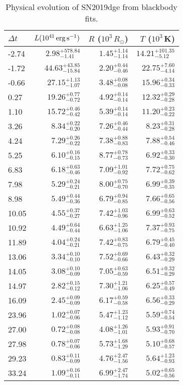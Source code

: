 \begin{table}[!htbp] 
	\centering 
	\caption{Physical evolution of SN2019dge from blackbody fits.} 
	\begin{tabular}{lrrr} 
		\hline 
		$\Delta t$ & $L (10^{41} \,{\rm erg\,s^{-1}})$ & $R$ ($10^{3}\,R_\odot$) & $T$ ($10^3$\,K) \\ 
		\hline
		-2.74 & $2.98^{+578.84}_{-1.41}$ &$1.45^{+1.14}_{-1.14}$ &$14.21^{+101.35}_{-5.12}$  \\
		-1.72 & $44.63^{+43.85}_{-15.84}$ &$2.20^{+0.44}_{-0.46}$ &$22.75^{+7.60}_{-4.14}$  \\
		-0.66 & $27.15^{+1.13}_{-1.07}$ &$3.48^{+0.08}_{-0.08}$ &$15.96^{+0.34}_{-0.33}$  \\
		0.27 & $19.26^{+0.77}_{-0.72}$ &$4.92^{+0.14}_{-0.14}$ &$12.32^{+0.29}_{-0.28}$  \\
		1.10 & $15.72^{+0.46}_{-0.42}$ &$5.39^{+0.14}_{-0.14}$ &$11.20^{+0.23}_{-0.22}$  \\
		3.26 & $8.34^{+0.22}_{-0.20}$ &$7.26^{+0.46}_{-0.44}$ &$8.23^{+0.31}_{-0.28}$  \\
		4.24 & $7.29^{+0.26}_{-0.22}$ &$7.38^{+0.88}_{-0.83}$ &$7.88^{+0.54}_{-0.46}$  \\
		5.25 & $6.10^{+0.16}_{-0.15}$ &$8.77^{+0.78}_{-0.73}$ &$6.92^{+0.33}_{-0.30}$  \\
		6.83 & $6.18^{+0.63}_{-0.46}$ &$7.09^{+1.01}_{-0.92}$ &$7.72^{+0.75}_{-0.62}$  \\
		7.98 & $5.29^{+0.24}_{-0.21}$ &$8.00^{+0.75}_{-0.70}$ &$6.99^{+0.39}_{-0.35}$  \\
		8.98 & $5.49^{+0.44}_{-0.36}$ &$6.79^{+0.94}_{-0.85}$ &$7.66^{+0.65}_{-0.56}$  \\
		10.05 & $4.55^{+0.37}_{-0.27}$ &$7.42^{+1.03}_{-0.96}$ &$6.99^{+0.63}_{-0.52}$  \\
		10.92 & $4.49^{+0.64}_{-0.44}$ &$6.63^{+1.25}_{-1.06}$ &$7.37^{+0.93}_{-0.75}$  \\
		11.89 & $4.04^{+0.24}_{-0.21}$ &$7.42^{+0.83}_{-0.75}$ &$6.79^{+0.45}_{-0.40}$  \\
		13.06 & $3.34^{+0.10}_{-0.10}$ &$7.52^{+0.69}_{-0.66}$ &$6.43^{+0.32}_{-0.29}$  \\
		14.05 & $3.08^{+0.10}_{-0.09}$ &$7.05^{+0.63}_{-0.59}$ &$6.51^{+0.32}_{-0.29}$  \\
		14.97 & $2.82^{+0.15}_{-0.12}$ &$7.30^{+1.21}_{-1.06}$ &$6.25^{+0.57}_{-0.49}$  \\
		16.09 & $2.45^{+0.09}_{-0.09}$ &$6.17^{+0.59}_{-0.58}$ &$6.56^{+0.33}_{-0.29}$  \\
		23.96 & $1.02^{+0.07}_{-0.06}$ &$5.47^{+1.23}_{-1.12}$ &$5.59^{+0.74}_{-0.54}$  \\
		27.00 & $0.72^{+0.08}_{-0.08}$ &$4.08^{+1.26}_{-1.01}$ &$5.93^{+0.91}_{-0.70}$  \\
		27.98 & $0.78^{+0.07}_{-0.06}$ &$5.73^{+1.68}_{-1.29}$ &$5.10^{+0.68}_{-0.57}$  \\
		29.23 & $0.83^{+0.11}_{-0.09}$ &$4.76^{+2.47}_{-1.56}$ &$5.64^{+1.23}_{-0.93}$  \\
		33.24 & $1.09^{+0.16}_{-0.11}$ &$6.99^{+2.47}_{-1.74}$ &$5.02^{+0.65}_{-0.56}$  \\
		\hline 
	\end{tabular} 
	\label{tab:bbfit} 
\end{table} 

